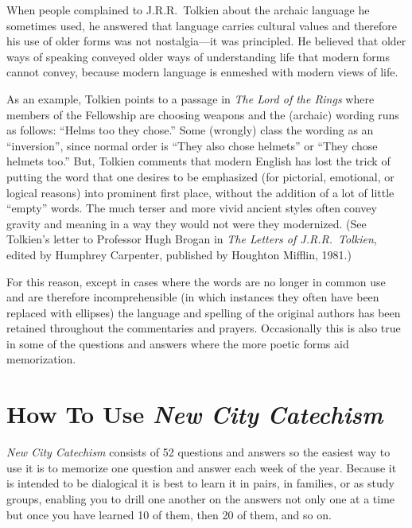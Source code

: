 \documentclass[titlepage]{memoir}
\begin{document}
When people complained to J.R.R.\ Tolkien about the archaic language he sometimes used, he answered that language carries cultural values and therefore his use of older forms was not nostalgia\thinspace{}---\thinspace{}it was principled. He believed that older ways of speaking conveyed older ways of understanding life that modern forms cannot convey, because modern language is enmeshed with modern views of life.

As an example, Tolkien points to a passage in \emph{The Lord of the Rings}\/ where members of the Fellowship are choosing weapons and the (archaic) wording runs as follows: ``Helms too they chose.'' Some (wrongly) class the wording as an ``inversion'', since normal order is ``They also chose helmets'' or ``They chose helmets too.'' But, Tolkien comments that modern English has lost the trick of putting the word that one desires to be emphasized (for pictorial, emotional, or logical reasons) into prominent first place, without the addition of a lot of little ``empty'' words. The much terser and more vivid ancient styles often convey gravity and meaning in a way they would not were they modernized. (See Tolkien's letter to Professor Hugh Brogan in \emph{The Letters of J.R.R.\ Tolkien}, edited by Humphrey Carpenter, published by Houghton Mifflin, 1981.)

For this reason, except in cases where the words are no longer in common use and are therefore incomprehensible (in which instances they often have been replaced with ellipses) the language and spelling of the original authors has been retained throughout the commentaries and prayers. Occasionally this is also true in some of the questions and answers where the more poetic forms aid memorization.


\section{How To Use \emph{New City Catechism}}
\emph{New City Catechism}\/ consists of 52 questions and answers so the easiest way to use it is to memorize one question and answer each week of the year. Because it is intended to be dialogical it is best to learn it in pairs, in families, or as study groups, enabling you to drill one another on the answers not only one at a time but once you have learned 10 of them, then 20 of them, and so on.
\end{document}
